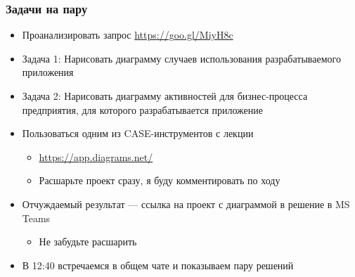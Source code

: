 \documentclass[xetex,mathserif,serif]{beamer}
\begin{document}
    \begin{frame}
        \frametitle{Задачи на пару}
        \begin{itemize}
            \item Проанализировать запрос \url{https://goo.gl/MiyH8c}
            \item Задача 1: Нарисовать диаграмму случаев использования разрабатываемого приложения
            \item Задача 2: Нарисовать диаграмму активностей для бизнес-процесса предприятия, для которого разрабатывается приложение
            \item Пользоваться одним из CASE-инструментов с лекции
            \begin{itemize}
                \item \url{https://app.diagrams.net/}
                \item Расшарьте проект сразу, я буду комментировать по ходу
            \end{itemize}
            \item Отчуждаемый результат --- ссылка на проект с диаграммой в решение в MS Teams
            \begin{itemize}
                \item Не забудьте расшарить
            \end{itemize}
            \item В 12:40 встречаемся в общем чате и показываем пару решений
        \end{itemize}
    \end{frame}
\end{document}
